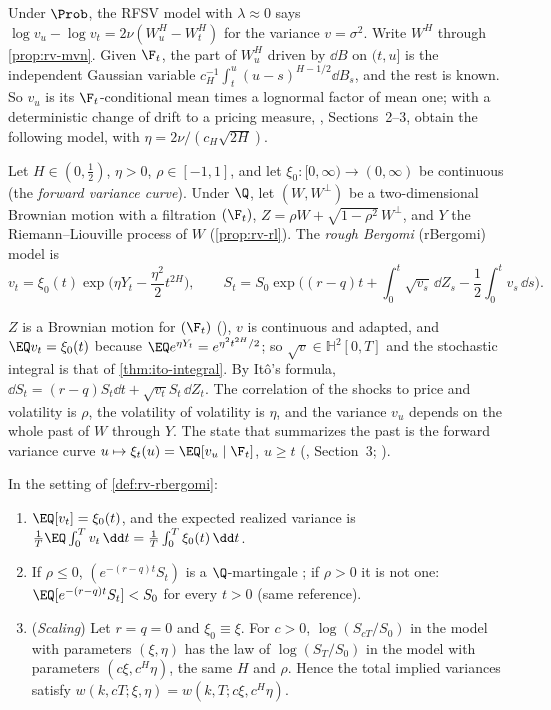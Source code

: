 Under $\Prob$, the RFSV model with $\lambda\approx0$ says $\log v_u-\log v_t=2\nu(W^H_u-W^H_t)$ for the variance
$v=\sigma^2$. Write $W^H$ through \cref{prop:rv-mvn}. Given $\F_t$, the part of $W^H_u$ driven by $\dd B$ on
$(t,u]$ is the independent Gaussian variable $c_H^{-1}\int_t^u(u-s)^{H-1/2}\dd B_s$, and the rest is known. So $v_u$
is its $\F_t$-conditional mean times a lognormal factor of mean one; with a deterministic change of drift to a pricing
measure, \textcite{bayer-friz-gatheral-2016}, Sections~2--3, obtain the following model, with
$\eta=2\nu/(c_H\sqrt{2H})$.

\begin{definition}\label{def:rv-rbergomi}
Let $H\in(0,\frac12)$, $\eta>0$, $\rho\in[-1,1]$, and let $\xi_0:[0,\infty)\to(0,\infty)$ be continuous (the
\emph{forward variance curve}). Under $\Q$, let $(W,W^\perp)$ be a two-dimensional Brownian motion with a
filtration $(\F_t)$, $Z=\rho W+\sqrt{1-\rho^2}\,W^\perp$, and $Y$ the Riemann--Liouville process of $W$
(\cref{prop:rv-rl}). The \emph{rough Bergomi} (rBergomi) model is
\begin{equation}\label{eq:rv-rbergomi}
  v_t=\xi_0(t)\exp\Big(\eta Y_t-\frac{\eta^2}2t^{2H}\Big),\qquad
  S_t=S_0\exp\Big((r-q)t+\int_0^t\sqrt{v_s}\,\dd Z_s-\frac12\int_0^tv_s\,\dd s\Big).
\end{equation}
\end{definition}

$Z$ is a Brownian motion for $(\F_t)$ (), $v$ is continuous and adapted, and
$\EQ v_t=\xi_0(t)$ because $\EQ e^{\eta Y_t}=e^{\eta^2t^{2H}/2}$; so $\sqrt v\in\mathbb H^2[0,T]$ and the stochastic
integral is that of \cref{thm:ito-integral}. By It\^o's formula, $\dd S_t=(r-q)S_t\dd t+\sqrt{v_t}S_t\,\dd Z_t$. The
correlation of the shocks to price and volatility is $\rho$, the volatility of volatility is $\eta$, and the
variance $v_u$ depends on the whole past of $W$ through $Y$. The state that summarizes the past is the forward
variance curve $u\mapsto\xi_t(u)=\EQ[v_u\mid\F_t]$, $u\ge t$ (\textcite{bayer-friz-gatheral-2016}, Section~3;
).

\begin{proposition}\label{prop:rv-rbergomi}
In the setting of \cref{def:rv-rbergomi}:
\begin{enumerate}[label=(\roman*)]
  \item $\EQ[v_t]=\xi_0(t)$, and the expected realized variance is $\frac1T\EQ\int_0^Tv_t\,\dd t=\frac1T\int_0^T\xi_0(t)\,\dd t$.
  \item If $\rho\le0$, $(e^{-(r-q)t}S_t)$ is a $\Q$-martingale \citep[Theorem~1]{gassiat-2019}; if $\rho>0$ it is
    not one: $\EQ[e^{-(r-q)t}S_t]<S_0$ for every $t>0$ (same reference).
  \item (\emph{Scaling}) Let $r=q=0$ and $\xi_0\equiv\xi$. For $c>0$, $\log(S_{cT}/S_0)$ in the model with
    parameters $(\xi,\eta)$ has the law of $\log(S_T/S_0)$ in the model with parameters $(c\xi,c^H\eta)$, the same
    $H$ and $\rho$. Hence the total implied variances satisfy $w(k,cT;\xi,\eta)=w(k,T;c\xi,c^H\eta)$.
\end{enumerate}
\end{proposition}

